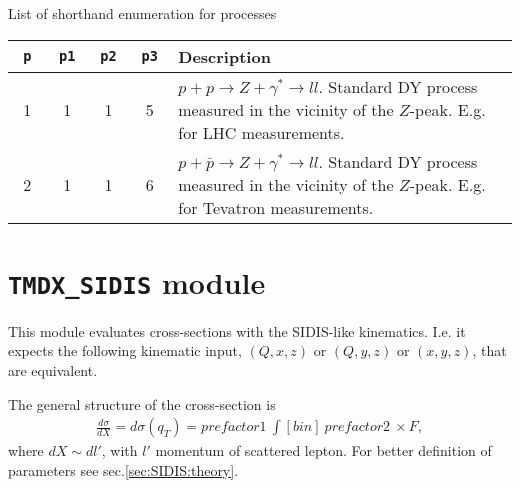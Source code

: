 \documentclass[prd,nofootinbib,eqsecnum,final]{revtex4}
\renewcommand{\(}{\left(}
\renewcommand{\)}{\right)}
\renewcommand{\[}{\left[}
\renewcommand{\]}{\right]}
\begin{document}
\begin{center}
\label{tab:p=p1p2p3}List of shorthand enumeration for processes
\\
\begin{tabular}{||c||c|c|c||p{12cm}||}
\hline\hline
$\quad$\texttt{p}$\quad$ &$\quad$\texttt{p1}$\quad$ &$\quad$\texttt{p2}$\quad$ &$\quad$\texttt{p3}$\quad$&  Description 
\\\hline
1 & 1 & 1 & 5 & $p+p\to Z+\gamma^*\to ll$. Standard DY process measured in the vicinity of the $Z$-peak. E.g. for LHC measurements.
\\\hline
2 & 1 & 1 & 6 & $p+\bar p\to Z+\gamma^*\to ll$. Standard DY process measured in the vicinity of the $Z$-peak. E.g. for Tevatron measurements.
\\\hline\hline
\end{tabular}
\end{center}


\newpage
\section{\texttt{TMDX{\_}SIDIS} module}
\label{TMDXs}

This module evaluates cross-sections with the SIDIS-like kinematics. I.e. it expects the following kinematic input, $(Q,x,z)$ or $(Q,y,z)$ or $(x,y,z)$, that are equivalent.

The general structure of the cross-section is
\begin{eqnarray}
\frac{d\sigma}{dX}=
d\sigma(q_T)=prefactor1~\int [bin] ~prefactor2~\times F,
\end{eqnarray}
where $dX\sim dl'$, with $l'$ momentum of scattered lepton. For better definition of parameters see sec.\ref{sec:SIDIS:theory}.
\end{document}
